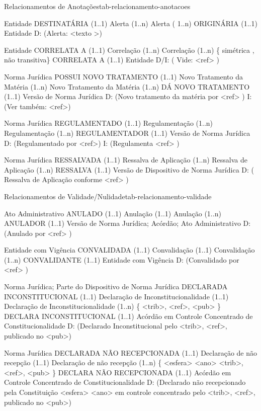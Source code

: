 \begin{tabelarelacionamento}{Relacionamentos
de Anotações}{tab-relacionamento-anotacoes}

  \relacionamento
  	{Entidade}
 	{DESTINATÁRIA (1..1)}
 	{Alerta}
 	{(1..n) Alerta ( 1..n)}
 	{ORIGINÁRIA (1..1)}
 	{Entidade}
 	{D: (Alerta:  <texto >)}

  \relacionamento
  	{Entidade}
 	{CORRELATA A (1..1)}
 	{Correlação}
 	{(1..n) Correlação (1..n)
	 \mypar
	 \{ simétrica , não transitiva\}}
 	{CORRELATA A (1..1)}
 	{Entidade}
 	{D/I: ( Vide: <ref> )}

  \relacionamento
  	{Norma Jurídica}
 	{POSSUI NOVO TRATAMENTO (1..1)}
 	{Novo Tratamento da Matéria}
 	{(1..n) Novo Tratamento da Matéria (1..n)}
 	{DÁ NOVO TRATAMENTO (1..1)}
 	{Versão de Norma Jurídica}
 	{D: (Novo tratamento da matéria por <ref> )
	 \mypar
	 I: (Ver também: <ref>)}

  \relacionamento
  	{Norma Jurídica}
 	{REGULAMENTADO (1..1)}
 	{Regulamentação}
 	{(1..n) Regulamentação (1..n)}
 	{REGULAMENTADOR (1..1)}
 	{Versão de Norma Jurídica}
 	{D: (Regulamentado por <ref>)
	 \mypar
	 I: (Regulamenta <ref> )}

  \relacionamento
  	{Norma Jurídica}
 	{RESSALVADA  (1..1)}
 	{Ressalva de Aplicação}
 	{(1..n) Ressalva de Aplicação  (1..n)}
 	{RESSALVA (1..1)}
 	{Versão de Dispositivo de Norma Jurídica}
 	{D: ( Ressalva de Aplicação conforme <ref> )}
\end{tabelarelacionamento}


\begin{tabelarelacionamento}{Relacionamentos
de Validade/Nulidade}{tab-relacionamento-validade}

  \relacionamento
  	{Ato Administrativo}
 	{ANULADO (1..1)}
 	{Anulação}
 	{(1..1) Anulação (1..n)}
 	{ANULADOR (1..1)}
 	{Versão de Norma Jurídica; Acórdão; Ato Administrativo}
 	{D: (Anulado por <ref> )}
 	
  \relacionamento
  	{Entidade com Vigência}
 	{CONVALIDADA (1..1)}
 	{Convalidação}
 	{(1..1) Convalidação (1..n)}
 	{CONVALIDANTE (1..1)}
 	{Entidade com Vigência}
 	{D: (Convalidado por <ref> )}
 	
  \relacionamento
  	{Norma Jurídica; Parte do Dispositivo de Norma Jurídica}
 	{DECLARADA INCONSTITUCIONAL (1..1)}
 	{Declaração de Inconstitucionalidade}
 	{(1..1) Declaração de Inconstitucionalidade (1..n)
	 \mypar
	 \{ <trib>, <ref>, <pub> \}}
 	{DECLARA INCONSTITUCIONAL (1..1)}
 	{Acórdão em Controle Concentrado de Constitucionalidade}
 	{D: (Declarado Inconstitucional pelo <trib>, <ref>,  publicado no <pub>)}
 	
  \relacionamento
  	{Norma Jurídica}
 	{DECLARADA NÃO RECEPCIONADA (1..1)}
 	{Declaração de não recepção}
 	{(1..1) Declaração de não recepção (1..n)
	 \mypar
	 \{ <esfera> <ano> <trib>, <ref>, <pub> \} }
 	{DECLARA NÃO RECEPCIONADA (1..1)}
 	{Acórdão em Controle Concentrado de Constitucionalidade}
 	{D: (Declarado não recepcionado pela Constituição <esfera> <ano> em controle concentrado pelo <trib>, <ref>, publicado no <pub>)}
 	
\end{tabelarelacionamento}

